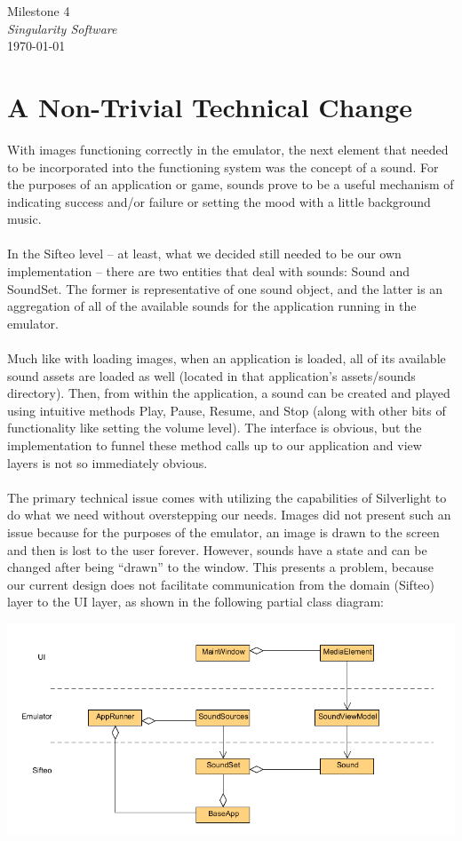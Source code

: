 \documentclass[12pt]{article}
\begin{document}
\begin{center}
	\LARGE{Milestone 4} \\
	\Large{\textit{Singularity Software}} \\
	\vspace{.05in}
	\normalsize{\today} \\
\end{center}

\section*{A Non-Trivial Technical Change}
With images functioning correctly in the emulator, the next element that needed to be incorporated into the functioning system was the concept of a sound. For the purposes of an application or game, sounds prove to be a useful mechanism of indicating success and/or failure or setting the mood with a little background music. \\\\
In the Sifteo level – at least, what we decided still needed to be our own implementation – there are two entities that deal with sounds: Sound and SoundSet. The former is representative of one sound object, and the latter is an aggregation of all of the available sounds for the application running in the emulator. \\\\
Much like with loading images, when an application is loaded, all of its available sound assets are loaded as well (located in that application’s assets/sounds directory). Then, from within the application, a sound can be created and played using intuitive methods Play, Pause, Resume, and Stop (along with other bits of functionality like setting the volume level). The interface is obvious, but the implementation to funnel these method calls up to our application and view layers is not so immediately obvious. \\\\
The primary technical issue comes with utilizing the capabilities of Silverlight to do what we need without overstepping our needs. Images did not present such an issue because for the purposes of the emulator, an image is drawn to the screen and then is lost to the user forever. However, sounds have a state and can be changed after being “drawn” to the window. This presents a problem, because our current design does not facilitate communication from the domain (Sifteo) layer to the UI layer, as shown in the following partial class diagram:
\begin{center}
\includegraphics[scale=.5]{classDiagram.png}
\end{center}
\end{document}
